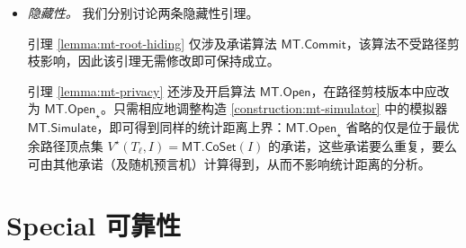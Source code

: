 \documentclass[american,singlepageview]{snargs-book-zh}
\newcommand{\Event}{E}
\newcommand{\CollisionEvent}{\Event_{\mathrm{col}}}
\newcommand{\SubsetEvent}{\Event_{\mathrm{sub}}}
\newcommand{\ROFunction}{f}
\newcommand{\CMMessageLength}{\ell}
\newcommand{\MTGraph}{T}
\newcommand{\MTVertexSet}{V}
\newcommand{\MTSymbol}{\mathsf{MT}}
\newcommand{\MTCommit}{\MTSymbol.\mathsf{Commit}}
\newcommand{\MTOpen}{\MTSymbol.\mathsf{Open}}
\newcommand{\MTCheck}{\MTSymbol.\mathsf{Check}}
\newcommand{\MTSimulator}{\MTSymbol.\mathsf{Simulate}}
\newcommand{\MTMessageLength}{\CMMessageLength}
\newcommand{\MTCommitment}{\mathsf{rt}}
\newcommand{\MTAuthPath}{\mathsf{auth}}
\newcommand{\MTProof}{\mathsf{pf}}
\newcommand{\MTMessageIndex}{i}
\newcommand{\MTMessageIndexSet}{I}
\newcommand{\MTMessageEntry}{m}
\newcommand{\MTMessageVector}{\mathbf{\MTMessageEntry}}
\newcommand{\MTMessageSubVector}{\mathbf{a}}
\newcommand{\MTDeriveVertexSet}{\MTSymbol.\mathsf{CoSet}}
\newcommand{\MTCoPathOptVertexSet}{\MTVertexSet^{\star}(\MTGraph_{\MTMessageLength},\MTMessageIndexSet)}
\newcommand{\MTExpandOpening}{\MTSymbol.\mathsf{Expand}}
\begin{document}
\begin{itemize}
  每次出现 $\MTCheck$ 均改为 $\MTCheck_{\star}$，每次出现 $\MTOpen$ 均改为 $\MTOpen_{\star}$。在分析事件 $\SubsetEvent\mid\neg\CollisionEvent$ 时，需要引入单点位置的认证路径，而在路径剪枝格式中此类路径不存在；相应地，改为使用展开后的证明中的认证路径。具体地，对 $\MTMessageIndex\in\MTMessageIndexSet$，令 $\MTAuthPath_{\MTMessageIndex}$ 为
  \[
    \MTExpandOpening^{\ROFunction}(\MTProof,\MTMessageIndexSet)
    \text{ 中索引为 }\MTMessageIndex\text{ 的认证路径};
  \]
  然后
  \[
    \MTCheck_{\star}^{\ROFunction}(\MTCommitment,\MTMessageIndexSet,\MTMessageSubVector,\MTProof)=1
    \implies
    \MTCheck^{\ROFunction}(\MTCommitment,\MTMessageIndex,\MTMessageSubVector[\MTMessageIndex],\MTAuthPath_{\MTMessageIndex})=1.
  \]
  同理，在引理 \ref{lemma:mt-extractability-same-trees} 的证明中，令 $\MTAuthPath_{\MTMessageIndex}'$ 为
  \[
    \MTExpandOpening^{\ROFunction}(\MTProof',\MTMessageIndexSet)
    \text{ 中索引为 }\MTMessageIndex\text{ 的认证路径};
  \]
  然后
  \[
    \MTCheck_{\star}^{\ROFunction}(\MTCommitment,\MTMessageIndexSet,\MTMessageVector[\MTMessageIndexSet],\MTProof')=1
    \implies
    \MTCheck^{\ROFunction}(\MTCommitment,\MTMessageIndex,\MTMessageVector[\MTMessageIndex],\MTAuthPath_{\MTMessageIndex}')=1.
  \]
  最后，仍依赖针对 $\MTCheck$ 的碰撞引理（尽管陈述涉及 $\MTCheck_{\star}$）。

  \item \emph{隐藏性。}
  我们分别讨论两条隐藏性引理。

  引理 \ref{lemma:mt-root-hiding} 仅涉及承诺算法 $\MTCommit$，该算法不受路径剪枝影响，因此该引理无需修改即可保持成立。

  引理 \ref{lemma:mt-privacy} 还涉及开启算法 $\MTOpen$，在路径剪枝版本中应改为 $\MTOpen_{\star}$。只需相应地调整构造 \ref{construction:mt-simulator} 中的模拟器 $\MTSimulator$，即可得到同样的统计距离上界：$\MTOpen_{\star}$ 省略的仅是位于最优余路径顶点集 $\MTCoPathOptVertexSet=\MTDeriveVertexSet(\MTMessageIndexSet)$ 的承诺，这些承诺要么重复，要么可由其他承诺（及随机预言机）计算得到，从而不影响统计距离的分析。
\end{itemize}

\chapter{Special 可靠性}
\label{chapter:special-soundness}
\end{document}
